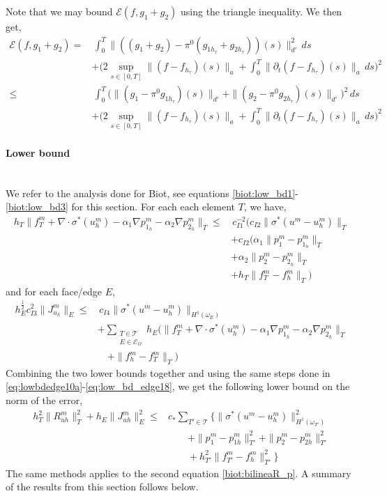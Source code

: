Note that we may bound $\mathcal{E}(f,g_1+g_2)$ using the triangle inequality. We then get,
\begin{align*}
\mathcal{E}(f,g_1 + g_2) = & \, \int_0^{T}  \|((g_1+g_2)-\pi^0 (g_{1h_\tau}+g_{2h_\tau}))(s)\|^2_{d'} \, ds \\
& + \biggl( 2 \sup_{s \in [0,T]} \| (f - f_{h_\tau})(s)\|_a + \int_0^{T} \| \partial_t (f - f_{h_\tau})(s)\|_a \, ds \biggr)^2 \\
\leq & \, \int_0^{T} \biggl( \|(g_1-\pi^0g_{1h_\tau})(s)\|_{d'} + \|(g_2-\pi^0 g_{2h_\tau})(s)\|_{d'} \biggr)^2 \, ds \\
& + \biggl( 2 \sup_{s \in [0,T]} \| (f - f_{h_\tau})(s)\|_a + \int_0^{T} \| \partial_t (f - f_{h_\tau})(s)\|_a \, ds \biggr)^2
\end{align*}

\paragraph{Lower bound}\mbox{}\\
We refer to the analysis done for Biot, see equations \eqref{biot:low_bd1}-\eqref{biot:low_bd3} for this section. For each each element $T$, we have,
\begin{align*} 
h_T\|f_T^m + \nabla \cdot \sigma^{\ast}(u_h^m) - \alpha_1 \nabla p_{1_h}^m - \alpha_2 \nabla p_{2_h}^m \|_T \leq & \, c_{I1}^{-2} (c_{I2}\|\sigma^{\ast}(u^m-u^m_h) \|_T \\
& + c_{I2}(\alpha_1 \| p_1^m-p_{1_h}^m\|_T  \\
& + \alpha_2 \| p_2^m-p_{2_h}^m\|_T \\
& + h_T\| f^m_T-f^m_h\|_T)
\end{align*}
and for each face/edge $E$,
\begin{align*}
h_E^{\frac{1}{2}} c_{I3}^2 \|J^m_{u_h}\|_E \leq & \, c_{I4} \| \sigma^{\ast}(u^m-u^m_h) \|_{H^1(\omega_E)} \\
& +  \sum_{\substack{T \in \mathcal{T} \\ E \in \mathcal{E}_\Omega}} h_E (\|f^m_T + \nabla \cdot \sigma^{\ast}(u^m_h) - \alpha_1 \nabla p_{1_h}^m - \alpha_2 \nabla p_{2_h}^m\|_T \\
& \quad + \|f^m_h-f^m_T\|_T)
\end{align*}
Combining the two lower bounds together and using the same steps done in \eqref{eq:lowbdedge10a}-\eqref{eq:low_bd_edge18}, we get the following lower bound on the norm of the error,
\begin{align*}
h_T^2 \| R_{uh}^m\|_T^2 + h_E\| J_{uh}^m\|_E^2 \leq & c_* \sum_{T' \in \mathcal{T}} \bigl\{ \| \sigma^*(u^m-u^m_h) \|^2_{H^1(\omega_{T'})} \\
& \quad \quad + \| p_1^m-p^m_{1h}\|^2_{T'} + \| p_2^m-p^m_{2h}\|^2_{T'} \\
& \quad \quad + h^2_{T'}\| f^m_{T'}-f^m_h\|^2_{T'}\bigr\}
\end{align*}
The same methods applies to the second equation \eqref{biot:bilineaR_p}. A summary of the results from this section follows below. 
